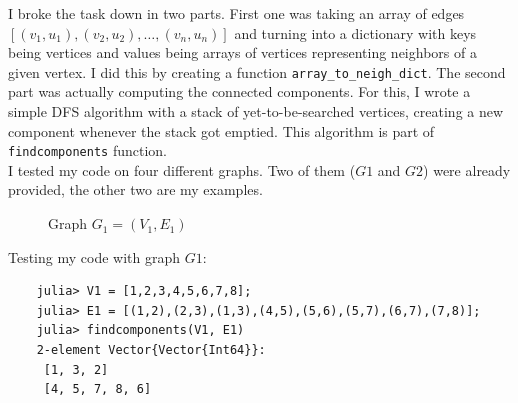 \documentclass[11pt,a4paper]{article}
\theoremstyle{plain}
\theoremstyle{definition}
\theoremstyle{remark}
\begin{document}
\noindent
I broke the task down in two parts. First one was taking an array of edges $[(v_1, u_1), (v_2, u_2), \ldots , (v_n, u_n)]$ and turning into a 
dictionary with keys being vertices and values being arrays of vertices representing neighbors of a given vertex. I did this by creating a function
\texttt{array\_to\_neigh\_dict}. The second part was actually computing the connected components. For this, I wrote a simple DFS algorithm
with a stack of yet-to-be-searched vertices, creating a new component whenever the stack got emptied. This algorithm is part of \texttt{findcomponents} function.\\

\noindent
I tested my code on four different graphs. Two of them ($G1$ and $G2$) were already provided, the other two are my examples.

\vspace*{10px}

\begin{figure}[H]
\centering
{}
\caption{Graph $G_1=(V_1,E_1)$}
\end{figure}

\vspace*{10px}
\noindent
Testing my code with graph $G1$: 

\begin{verbatim}
    julia> V1 = [1,2,3,4,5,6,7,8];
    julia> E1 = [(1,2),(2,3),(1,3),(4,5),(5,6),(5,7),(6,7),(7,8)];   
    julia> findcomponents(V1, E1)
    2-element Vector{Vector{Int64}}:
     [1, 3, 2]
     [4, 5, 7, 8, 6]
\end{verbatim}
\end{document}
